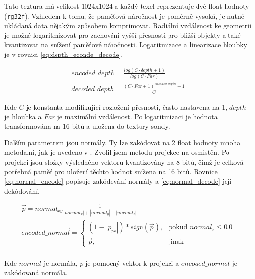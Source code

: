 Tato textura má velikost 1024x1024 a každý texel reprezentuje dvě float hodnoty (\texttt{rg32f}). Vzhledem k tomu, že paměťová náročnost je poměrně vysoká, je nutné ukládaná data nějakým způsobem komprimovat. Radiální vzdálenost ke geometrii je možné logaritmizovat pro zachování vyšší přesnosti pro bližší objekty a také kvantizovat na snížení paměťové náročnosti. Logaritmizace a linearizace hloubky je v rovnici \ref{eq:depth_econde_decode}.

\begin{equation} \label{eq:depth_econde_decode}
	\begin{gathered}
		encoded\_depth = \frac{log(C \cdot depth + 1)}{log(C \cdot Far)}\\
		decoded\_depth = \frac{(C \cdot Far + 1)^{encoded\_depth} - 1}{C}
	\end{gathered}
\end{equation}

Kde $C$ je konstanta modifikující rozložení přesnosti, často nastavena na 1, $depth$ je hloubka a $Far$ je maximální vzdálenost. Po logaritmizaci je hodnota transformována na 16 bitů a uložena do textury sondy.

Dalším parametrem jsou normály. Ty lze zakódovat na 2 float hodnoty mnoha metodami, jak je uvedeno v \cite{Cigolle2014ASO}. Zvolil jsem metodu projekce na osmistěn. Po projekci jsou složky výsledného vektoru kvantizovány na 8 bitů, čímž je celková potřebná paměť pro uložení těchto hodnot snížena na 16 bitů. Rovnice \ref{eq:normal_encode} popisuje zakódování normály a \ref{eq:normal_decode} její dekódování.

\begin{equation} \label{eq:normal_encode}
	\begin{gathered}
		\vec{p} = normal_{xy} \frac{1}{|normal_x| + |normal_y| + |normal_z|} \\
		\vec{encoded\_normal} = \begin{cases}
            (1 - |p_{yx}|) * sign(\vec{p}),& \text{pokud } normal_z \leq 0.0\\
            \vec{p},              & \text{jinak}
        \end{cases}\\
	\end{gathered}
\end{equation}

Kde $normal$ je normála, $p$ je pomocný vektor k projekci a $encoded\_normal$ je zakódovaná normála.

